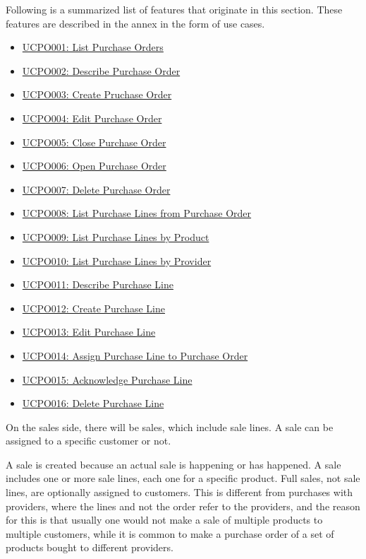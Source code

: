 Following is a summarized list of features that originate in this section. These features are described in the annex in the form of use cases.
\hfill\break
\begin{itemize}
\item \hyperref[UCPO001]{UCPO001: List Purchase Orders}
\item \hyperref[UCPO002]{UCPO002: Describe Purchase Order}
\item \hyperref[UCPO003]{UCPO003: Create Pruchase Order}
\item \hyperref[UCPO004]{UCPO004: Edit Purchase Order}
\item \hyperref[UCPO005]{UCPO005: Close Purchase Order}
\item \hyperref[UCPO006]{UCPO006: Open Purchase Order}
\item \hyperref[UCPO007]{UCPO007: Delete Purchase Order}
\item \hyperref[UCPO008]{UCPO008: List Purchase Lines from Purchase Order}
\item \hyperref[UCPO009]{UCPO009: List Purchase Lines by Product}
\item \hyperref[UCPO010]{UCPO010: List Purchase Lines by Provider}
\item \hyperref[UCPO011]{UCPO011: Describe Purchase Line}
\item \hyperref[UCPO012]{UCPO012: Create Purchase Line}
\item \hyperref[UCPO013]{UCPO013: Edit Purchase Line}
\item \hyperref[UCPO014]{UCPO014: Assign Purchase Line to Purchase Order}
\item \hyperref[UCPO015]{UCPO015: Acknowledge Purchase Line}
\item \hyperref[UCPO016]{UCPO016: Delete Purchase Line}
\end{itemize}
\hfill\break
On the sales side, there will be sales, which include sale lines. A sale can be assigned to a specific customer or not.

A sale is created because an actual sale is happening or has happened. A sale includes one or more sale lines, each one for a specific product. Full sales, not sale lines, are optionally assigned to customers. This is different from purchases with providers, where the lines and not the order refer to the providers, and the reason for this is that usually one would not make a sale of multiple products to multiple customers, while it is common to make a purchase order of a set of products bought to different providers.


